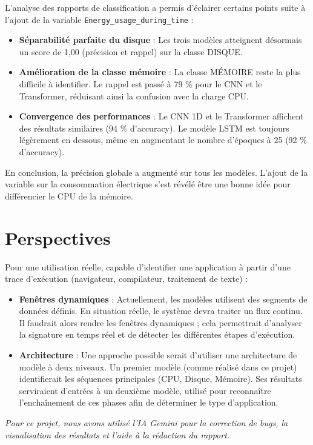 \documentclass[12pt,a4paper]{report}
\begin{document}
L'analyse des rapports de classification a permis d'éclairer certains points suite à l'ajout de la variable \texttt{Energy\_usage\_during\_time} :

\begin{itemize}
    \item \textbf{Séparabilité parfaite du disque} : Les trois modèles atteignent désormais un score de 1,00 (précision et rappel) sur la classe DISQUE.
    \item \textbf{Amélioration de la classe mémoire} : La classe MÉMOIRE reste la plus difficile à identifier. Le rappel est passé à 79 \% pour le CNN et le Transformer, réduisant ainsi la confusion avec la charge CPU.
    \item \textbf{Convergence des performances} : Le CNN 1D et le Transformer affichent des résultats similaires (94 \% d'accuracy). Le modèle LSTM est toujours légèrement en dessous, même en augmentant le nombre d'époques à 25 (92 \% d'accuracy).
\end{itemize}

En conclusion, la précision globale a augmenté sur tous les modèles. L'ajout de la variable sur la consommation électrique s'est révélé être une bonne idée pour différencier le CPU de la mémoire.


\chapter{Perspectives}
Pour une utilisation réelle, capable d'identifier une application à partir d'une trace d'exécution (navigateur, compilateur, traitement de texte) :

\begin{itemize}
    \item \textbf{Fenêtres dynamiques} : Actuellement, les modèles utilisent des segments de données définis. En situation réelle, le système devra traiter un flux continu. Il faudrait alors rendre les fenêtres dynamiques ; cela permettrait d'analyser la signature en temps réel et de détecter les différentes étapes d'exécution.
    \item \textbf{Architecture} : Une approche possible serait d'utiliser une architecture de modèle à deux niveaux. Un premier modèle (comme réalisé dans ce projet) identifierait les séquences principales (CPU, Disque, Mémoire). Ses résultats serviraient d'entrées à un deuxième modèle, utilisé pour reconnaître l'enchaînement de ces phases afin de déterminer le type d'application.
\end{itemize}

\vfill
\begin{center}
    \textit{Pour ce projet, nous avons utilisé l'IA Gemini pour la correction de bugs, la visualisation des résultats et l'aide à la rédaction du rapport.}
\end{center}
\end{document}
